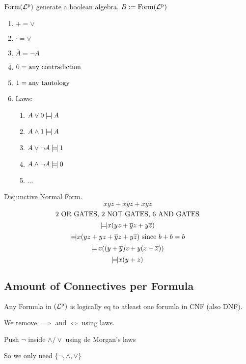 \documentclass[12pt]{article}
\begin{document}
\bboxexam
\begin{exam}
    \(\mathrm{Form}(\mathrm{\mathcal{L}^p_{}})\) generate a boolean algebra. \(B:=\mathrm{Form}(\mathrm{\mathcal{L}^p_{}})\)
    \begin{enumerate}
        \item \(+=\vee\)
        \item \(\cdot=\vee\)
        \item \(\overline A=\neg A\)
        \item \(0=\text{any contradiction}\)
        \item \(1=\text{any tautology}\)
        \item Laws:
            \begin{enumerate}
                \item \(A\lor 0\mathbin{\mid\!=\!\mid} A\)
                \item \(A\land 1\mathbin{\mid\!=\!\mid} A\)
                \item \(A\lor\neg A\mathbin{\mid\!=\!\mid} 1\)
                \item \(A\land\neg A\mathbin{\mid\!=\!\mid} 0\)
                \item ...
            \end{enumerate}
    \end{enumerate}
\end{exam}
\ebox

\bboxexam
\begin{exam}
    Disjunctive Normal Form.
    \[
        xyz+x\overline yz+xy\overline z
    \]
    \[
        \text{2 OR GATES, 2 NOT GATES, 6 AND GATES}
    \]
    \[
        \mathbin{\mid\!=\!\mid} x(yz+\overline yz+y\overline z)
    \]
    \[
        \mathbin{\mid\!=\!\mid} x(yz+yz+\overline yz+y\overline z)
        \text{ since }b+b=b
    \]
    \[
        \mathbin{\mid\!=\!\mid} x((y+\overline y)z+y(z+\overline z))
    \]
    \[
        \mathbin{\mid\!=\!\mid} x(y+z)
    \]
\end{exam}
\ebox

\subsection{Amount of Connectives per Formula}


\bboxthm
\begin{thm}
    Any Formula in \((\mathrm{\mathcal{L}^p_{}})\) is logically eq to atleast one forumla in CNF (also DNF).
\end{thm}
\ebox

\bboxnote
\begin{note}
    We remove \(\implies\) and \(\iff\) using laws.

    Push \(\neg\) inside \(\land/\lor\) using de Morgan's laws

    So we only need \(\{\neg,\land,\lor\}\)
\end{note}
\ebox
\end{document}
